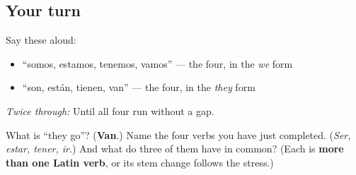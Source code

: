 \subsection*{Your turn}
Say these aloud:

\begin{itemize}
\raggedright
  \item \textquotedblleft{}somos, estamos, tenemos, vamos\textquotedblright{} — the four, in the \emph{we} form
  \item \textquotedblleft{}son, están, tienen, van\textquotedblright{} — the four, in the \emph{they} form
\end{itemize}

\emph{Twice through:} Until all four run without a gap.

\begin{tcolorbox}[breakable,colback=teal!4,colframe=teal!35!black,title={Before you move on}]
What is \textquotedblleft{}they go\textquotedblright{}? (\textbf{Van}.) Name the four verbs you have just completed. (\emph{Ser, estar, tener, ir}.) And what do three of them have in common? (Each is \textbf{more than one Latin verb}, or its stem change follows the stress.)
\end{tcolorbox}
